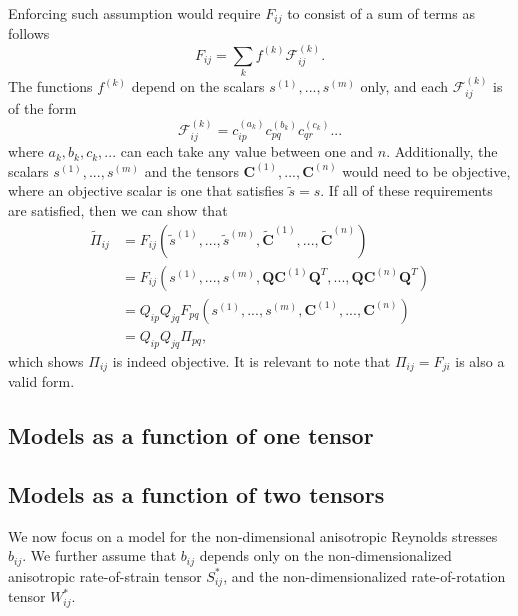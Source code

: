 \documentclass[oneside,a4paper,11pt]{report}
\newcommand{\nars}{b}           %
\newcommand{\Stau}{S^*}
\newcommand{\Wtau}{W^*}
\begin{document}
Enforcing such assumption would require $F_{ij}$ to consist of a sum of terms as follows
\begin{equation}
\label{poly_expan}
F_{ij} = \sum_{k} f^{(k)}\mathcal{F}_{ij}^{(k)}.
\end{equation}
The functions $f^{(k)}$ depend on the scalars $s^{(1)}, ...,s^{(m)}$ only, and each $\mathcal{F}_{ij}^{(k)}$ is of the form
\begin{equation}
\label{tensor_product}
\mathcal{F}_{ij}^{(k)} = c^{(a_k)}_{ip}c^{(b_k)}_{pq}c^{(c_k)}_{qr}...
\end{equation}
where $a_k,b_k,c_k,...$ can each take any value between one and $n$. Additionally, the scalars $s^{(1)},...,s^{(m)}$ and the tensors $\mathbf{C}^{(1)},...,\mathbf{C}^{(n)}$ would need to be objective, where an objective scalar is one that satisfies $\tilde{s} = s$. If all of these requirements are satisfied, then we can show that
\begin{align}
\tilde{\Pi}_{ij} & = F_{ij}(\tilde{s}^{(1)}, ..., \tilde{s}^{(m)},\tilde{\mathbf{C}}^{(1)}, ..., \tilde{\mathbf{C}}^{(n)}) \nonumber \\
& = F_{ij}(s^{(1)}, ..., s^{(m)},\mathbf{Q} \mathbf{C}^{(1)}\mathbf{Q}^T, ..., \mathbf{Q} \mathbf{C}^{(n)}\mathbf{Q}^T) \nonumber \\
& = Q_{ip}Q_{jq} F_{pq}(s^{(1)}, ..., s^{(m)}, \mathbf{C}^{(1)}, ..., \mathbf{C}^{(n)}) \nonumber \\
&= Q_{ip}Q_{jq} \Pi_{pq}, 
\end{align}
which shows $\Pi_{ij}$ is indeed objective. It is relevant to note that $\Pi_{ij} = F_{ji}$ is also a valid form.

\subsection{Models as a function of one tensor}

\subsection{Models as a function of two tensors}
We now focus on a model for the non-dimensional anisotropic Reynolds stresses $\nars_{ij}$. We further assume that $\nars_{ij}$ depends only on the non-dimensionalized anisotropic rate-of-strain tensor $\Stau_{ij}$, and the non-dimensionalized rate-of-rotation tensor $\Wtau_{ij}$. 
\end{document}
